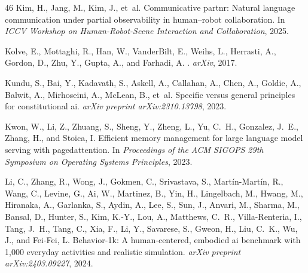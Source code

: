 \documentclass{article}
\theoremstyle{plain}
\theoremstyle{definition}
\theoremstyle{remark}
\begin{document}
\begin{thebibliography}{46}
Kim, H., Jang, M., Kim, J., et~al.
\newblock Communicative partnr: Natural language communication under partial
  observability in human--robot collaboration.
\newblock In \emph{ICCV Workshop on Human-Robot-Scene Interaction and
  Collaboration}, 2025.

Kolve, E., Mottaghi, R., Han, W., VanderBilt, E., Weihs, L., Herrasti, A.,
  Gordon, D., Zhu, Y., Gupta, A., and Farhadi, A.
.
\newblock \emph{arXiv}, 2017.

Kundu, S., Bai, Y., Kadavath, S., Askell, A., Callahan, A., Chen, A., Goldie,
  A., Balwit, A., Mirhoseini, A., McLean, B., et~al.
\newblock Specific versus general principles for constitutional ai.
\newblock \emph{arXiv preprint arXiv:2310.13798}, 2023.

Kwon, W., Li, Z., Zhuang, S., Sheng, Y., Zheng, L., Yu, C.~H., Gonzalez, J.~E.,
  Zhang, H., and Stoica, I.
\newblock Efficient memory management for large language model serving with
  pagedattention.
\newblock In \emph{Proceedings of the ACM SIGOPS 29th Symposium on Operating
  Systems Principles}, 2023.

Li, C., Zhang, R., Wong, J., Gokmen, C., Srivastava, S., Martín-Martín, R.,
  Wang, C., Levine, G., Ai, W., Martinez, B., Yin, H., Lingelbach, M., Hwang,
  M., Hiranaka, A., Garlanka, S., Aydin, A., Lee, S., Sun, J., Anvari, M.,
  Sharma, M., Bansal, D., Hunter, S., Kim, K.-Y., Lou, A., Matthews, C.~R.,
  Villa-Renteria, I., Tang, J.~H., Tang, C., Xia, F., Li, Y., Savarese, S.,
  Gweon, H., Liu, C.~K., Wu, J., and Fei-Fei, L.
\newblock Behavior-1k: A human-centered, embodied ai benchmark with 1,000
  everyday activities and realistic simulation.
\newblock \emph{arXiv preprint arXiv:2403.09227}, 2024{}.


\end{thebibliography}
\end{document}
